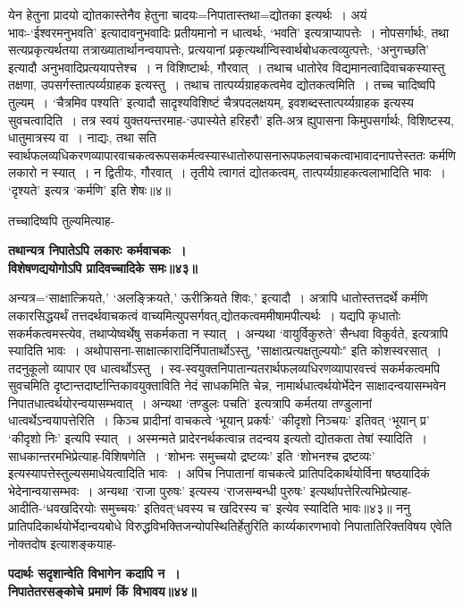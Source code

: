 {{{{ येन हेतुना प्रादयो द्योतकास्तेनैव हेतुना चादयः=निपातास्तथा=द्योतका इत्यर्थः~।
अयं भावः-`ईश्वरमनुभवति' इत्यादावनुभवादिः प्रतीयमानो न धात्वर्थः, `भवति' इत्यत्राप्यापत्तेः~।
नोपसर्गार्थः, तथा सत्यप्रकृत्यर्थतया तत्राख्यातार्थानन्वयापत्तेः, प्रत्ययानां प्रकृत्यर्थान्विस्वार्थबोधकत्वव्युत्पत्तेः, `अनुगच्छति' इत्यादौ अनुभवादिप्रत्ययापत्तेश्च~।
न विशिष्टार्थः, गौरवात्~।
तथाच धातोरेव विद्यमानत्वादिवाचकस्यास्तु तक्षणा, उपसर्गस्तात्पर्य्यग्राहक इत्यस्तु~।
तथाच तात्पर्य्यग्राहकत्वमेव द्योतकत्वमिति~।
 तच्च चादिष्वपि तुल्यम्~।
`चैत्रमिव पश्यति' इत्यादौ सादृश्यविशिष्टं चैत्रपदलक्षयम्, इवशब्दस्तात्पर्य्यग्राहक इत्यस्य सुवचत्वादिति~।
तत्र स्वयं युक्तयन्तरमाह-`उपास्येते हरिहरौ' इति-अत्र ह्युपासना किमुपसर्गार्थः, विशिष्टस्य, धातुमात्रस्य वा~।
नाद्यः,
तथा सति स्वार्थफलव्यधिकरणव्यापारवाचकत्वरूपसकर्मत्वस्यास्धातोरुपासनारूपफलवाचकत्वाभावा\-दनापत्तेस्ततः कर्मणि लकारो न स्यात्~।
न द्वितीयः, गौरवात्~।
तृतीये त्वागतं द्योतकत्वम्, तात्पर्य्यग्राहकत्वलाभादिति भावः~।
`दृश्यते' इत्यत्र `कर्मणि' इति शेषः॥४॥

तच्चादिष्वपि तुल्यमित्याह-
 \begin{center}{\bfseries तथान्यत्र निपातेऽपि लकारः कर्मवाचकः~।\\
 विशेषणद्ययोगोऽपि प्रादिवच्चादिके समः॥४३॥}\end{center}

 अन्यत्र=`साक्षात्क्रियते,' `अलङ्क्रियते,' ऊरीक्रियते शिवः,' इत्यादौ~।
अत्रापि धातोस्तत्तदर्थे कर्मणि लकारसिद्धयर्थं तत्तदर्थवाचकत्वं वाच्यमित्युपसर्गवत्,द्योतकत्वममीषामपीत्यर्थः~।
यद्यपि कृधातोः सकर्मकत्वमस्त्येव, तथाप्येष्वर्थेषु सकर्मकता न स्यात्~।
अन्यथा `वायुर्विकुरुते' सैन्धवा विकुर्वते, इत्यत्रापि स्यादिति भावः~।
 अथोपासना-साक्षात्कारादिर्निपातार्थोऽस्तु, "साक्षात्प्रत्यक्षतुल्ययोः" इति कोशस्वरसात्~।
तदनुकूलो व्यापार एव धात्वर्थोऽस्तु~।
स्व-स्वयुक्तनिपातान्यतरार्थफलव्यधिरणव्यापारवत्त्वं सकर्मकत्वमपि सुवचमिति दृष्टान्तदार्ष्टान्तिकावयुक्ताविति नेदं साधकमिति चेन्न, नामार्थधात्वर्थयोर्भेदेन साक्षादन्वयासम्भवेन निपातधात्वर्थयोरन्वयासम्भवात्~।
अन्यथा `तण्डुलः पचति' इत्यत्रापि कर्मतया तण्डुलानां धात्वर्थेऽन्वयापत्तेरिति~।
किञ्च प्रादीनां वाचकत्वे `भूयान् प्रकर्षः' `कीदृशो निञ्चयः' इतिवत् `भूयान् प्र' `कीदृशो निः' इत्यपि स्यात्~।
अस्मन्मते प्रादेरनर्थकत्वान्न तदन्वय इत्यतो द्योतकता तेषां स्यादिति~।
साधकान्तरमभिप्रेत्याह-विशिषणेति~।
`शोभनः समुच्चयो द्रष्टव्यः' इति `शोभनश्च द्रष्टव्यः' इत्यस्यापत्तेस्तुल्यसमाधेयत्वादिति भावः~।
 अपिच निपातानां वाचकत्वे प्रातिपदिकार्थयोर्विना षष्ठयादिकं भेदेनान्वयासम्भवः~।
अन्यथा `राजा पुरुषः' इत्यस्य `राजसम्बन्धी पुरुषः' इत्यर्थापत्तेरित्यभिप्रेत्याह-आदीति-`धवखदिरयोः समुच्चयः' इतिवत्`धवस्य च खदिरस्य च' इत्येव स्यादिति भावः॥४३॥
 ननु प्रातिपदिकार्थयोर्भेदान्वयबोधे विरुद्धविभक्तिजन्योपस्थितिर्हेतुरिति कार्य्यकारणभावो निपातातिरिक्तविषय एवेति नोक्तदोष इत्याशङ्कयाह-
 \begin{center}{\bfseries पदार्थः सदृशान्वेति विभागेन कदापि न~।\\
 निपातेतरसङ्कोचे प्रमाणं किं विभावय॥४४॥}\end{center}

}}}}

